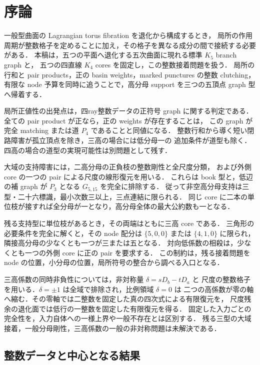 \section{序論}
\label{ar17:introduction}

一般型曲面の Lagrangian torus fibration を退化から構成するとき，
局所の作用周期が整数格子を定めることに加え，その格子を異なる成分の間で接続する必要がある．
本稿は，五つの平面へ退化する五次曲面に現れる標準 $K_5$ branch graph と，
五つの四直線 $K_4$ cores を固定し，この整数接着問題を扱う．
局所の行和と pair products，正の basin weights，marked punctures の整数 clutching，
有限な node 予算を同時に追うことで，高分母 support を三つの五頂点 graph 型へ帰着する．

局所正値性の出発点は，四ray整数データの正符号 graph に関する判定である．
全ての pair product が正なら，正の weights が存在することは，
この graph が完全 matching または道 $P_4$ であることと同値になる．
整数行和から導く短い閉路障害が孤立頂点を除き，三高の場合には低分母一の
追加条件が道型も除く．四高の場合の道型の実現可能性は別問題として残す．

大域の支持障害には，二高分母の正負枝の整数剛性と全尺度分類，
および外側 core の一つの pair による尺度の線形復元を用いる．
これらは book 型と，低辺の補 graph が $P_3$ となる $G_{5,15}$ を完全に排除する．
従って非空高分母支持は三型・二十六標識，最小次数三以上，三点連結に限られる．
同じ core に二本の単位枝が接すれば全分母が一となり，高分母全体の最大公約数も一となる．

残る支持型に単位枝があるとき，その両端はともに三高 core である．
三角形の必要条件を完全に解くと，その node 配分は
$\{5,0,0\}$ または $\{4,1,0\}$ に限られ，隣接高分母の少なくとも一つが三または五となる．
対向低係数の相殺は，少なくとも一つの外側 core に正の pair を要求する．
この制約は，残る接着問題を node の位置，小分母の位置，局所符号の整合から調べる入口となる．

三高係数の同時非負性については，非対称量 $\delta=sD_b-tD_a$ と
尺度の整数格子を用いる．$\delta=\pm1$ は全域で排除され，比例領域 $\delta=0$ は
二つの高係数が零の軸へ縮む．その零軸では二整数を固定した真の四次式による有限復元を，
尺度残余の退化面では低行の一整数を固定した有限復元を得る．
固定した入力ごとの完全性を，入力自体への一様上界や一般不存在とは区別する．
残る三型の大域接着，一般分母剛性，三高係数の一般の非対称問題は未解決である．

\subsection{整数データと中心となる結果}

